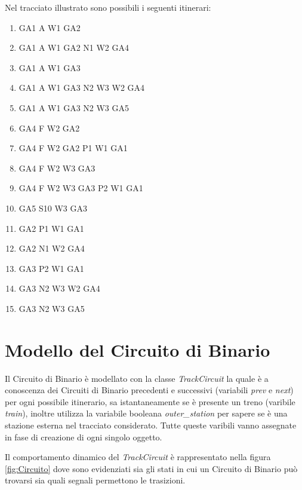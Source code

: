 Nel tracciato illustrato sono possibili i seguenti itinerari:
\begin{enumerate}
  \item GA1 A W1 GA2
  \item GA1 A W1 GA2 N1 W2 GA4
  \item GA1 A W1 GA3
  \item GA1 A W1 GA3 N2 W3 W2 GA4
  \item GA1 A W1 GA3 N2 W3 GA5
  \item GA4 F W2 GA2
  \item GA4 F W2 GA2 P1 W1 GA1
  \item GA4 F W2 W3 GA3
  \item GA4 F W2 W3 GA3 P2 W1 GA1
  \item GA5 S10 W3 GA3
  \item GA2 P1 W1 GA1
  \item GA2 N1 W2 GA4
  \item GA3 P2 W1 GA1
  \item GA3 N2 W3 W2 GA4
  \item GA3 N2 W3 GA5
\end{enumerate}

\section{Modello del Circuito di Binario}
Il Circuito di Binario è modellato con la classe \textit{TrackCircuit} la quale
è a conoscenza dei Circuiti di Binario precedenti e successivi (variabili
\textit{prev} e \textit{next}) per ogni possibile itinerario, sa istantaneamente
se è presente un treno (varibile \textit{train}), inoltre utilizza la variabile
booleana \textit{outer\_station} per sapere se è una stazione esterna nel
tracciato considerato. Tutte queste varibili vanno assegnate in fase di creazione di ogni
singolo oggetto.

Il comportamento dinamico del \textit{TrackCircuit} è rappresentato nella figura
\ref{fig:Circuito} dove sono evidenziati sia gli stati in cui un Circuito di Binario
può trovarsi sia quali segnali permettono le trasizioni.

